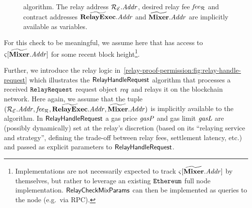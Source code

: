 \begin{figure}[!h]
  \centering
  \caption{\relaycheckrequest{} algorithm. The relay address $\mathcal{{R}_{E}}.\mathit{Addr}$, desired relay fee $\mathit{fee_{\mathcal{R}}}$ and contract addresses $\widetilde{\mathbf{RelayExec}}{}.\mathit{Addr}$ and $\widetilde{\mathbf{Mixer}}.\mathit{Addr}$ are implicitly available as variables.}
  \label{relay-proof-permission:fig:relay-request-check}
\end{figure}

\begin{remark}
  For this check to be meaningful, we assume here that \relayEthAccount{} has access to $\mathit{\varsigma}[\widetilde{\mathbf{Mixer}}.\mathit{Addr}]$ for some recent block height\footnote{Implementations are not necessarily expected to track $\mathit{\varsigma}[\widetilde{\mathbf{Mixer}}.\mathit{Addr}]$ by themselves, but rather to leverage an existing $\texttt{Ethereum}$ full node implementation. $\mathsf{RelayCheckMixParams}$ can then be implemented as queries to the node (e.g.~via RPC).}.
\end{remark}

\medskip

Further, we introduce the relay logic in~\cref{relay-proof-permission:fig:relay-handle-request} which illustrates the $\mathsf{RelayHandleRequest}$ algorithm that processes a received ${\mathtt{RelayRequest}}$ request object $\mathit{req}$ and relays it on the blockchain network. Here again, we assume that the tuple $(\mathcal{{R}_{E}}{}.\mathit{Addr},\allowbreak \mathit{fee_{\mathcal{R}}},\allowbreak \widetilde{\mathbf{RelayExec}}{}.\mathit{Addr},\allowbreak \widetilde{\mathbf{Mixer}}{}.\mathit{Addr})$ is implicitly available to the algorithm.
In $\mathsf{RelayHandleRequest}$ a gas price $\mathit{gasP}$ and gas limit $\mathit{gasL}$ are (possibly dynamically) set at the relay's discretion (based on its ``relaying service and strategy'', defining the trade-off between relay fees, settlement latency, etc.) and passed as explicit parameters to $\mathsf{RelayHandleRequest}$.


